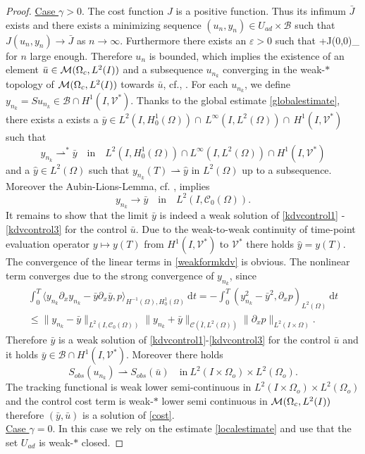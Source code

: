 \begin{proof}
\underline{Case $\gamma > 0$}. The cost function $J$ is a positive function. Thus its infimum $\bar J$ exists and there exists a minimizing sequence $(u_n,y_n) \in U_{ad} \times \mathcal B$ such that $J(u_n, y_n) \rightarrow \bar J$ as $n \rightarrow \infty$. Furthermore there exists an $\varepsilon>0$ such that
\be
\varepsilon+J(0,0)\geq \alpha {}_{\M}
\ee
for $n$ large enough. Therefore $u_n$ is bounded, which implies the existence of an element $\bar u\in\mathcal{M}(\Omega_c, L^{2}(I))$ and a subsequence $u_{n_k}$ converging in the weak-$*$ topology of $\mathcal{M}(\Omega_c, L^{2}(I))$ towards $\bar u$, cf., \cite[Corollary 3.30]{Brezis11}. For each $u_{n_k}$, we define $y_{n_k}=Su_{n_k}\in \mathcal B\cap H^1(I,\mathcal V^*)$. Thanks to the global estimate \eqref{globalestimate}, there exists a exists a $\bar y\in L^2(I,H^1_0(\Omega))\cap\,L^\infty(I,L^2(\Omega))\cap\,H^1(I,\mathcal V^\ast)$ such that
\[y_{n_k}\rightharpoonup^\ast\bar y\quad\text{in}\quad L^2(I,H^1_0(\Omega))\cap L^{\infty}(I,L^2(\Omega))\cap H^1(I,\mathcal V^\ast)\]
and a $\hat y\in L^2(\Omega)$ such that $y_{n_k}(T)\rightharpoonup \hat y$ in $L^2(\Omega)$ up to a subsequence. Moreover the Aubin-Lions-Lemma, cf. \cite[Chapter 3, Proposition 1.3]{showalter97}, implies
\[y_{n_k}\rightarrow\bar y\quad\text{in}\quad L^2(I,\mathcal C_0(\Omega)).\]
It remains to show that the limit $\bar y$ is indeed a weak solution of \eqref{kdvcontrol1} - \eqref{kdvcontrol3} for the control $\bar u$. Due to the weak-to-weak continuity of time-point evaluation operator $y\mapsto y(T)$ from $H^1(I,\mathcal V^\ast)$ to $\mathcal V^\ast$ there holds $\hat y=y(T)$.  The convergence of the linear terms in \eqref{weakformkdv} is obvious. The nonlinear term converges due to the strong convergence of $y_{n_k}$, since
\begin{multline*}
\int_0^T\langle y_{n_k}\partial_xy_{n_k}-\bar y\partial_x\bar y,p\rangle_{H^{-1}(\Omega),H^1_0(\Omega)}~\mathrm dt=-\int_0^T(y_{n_k}^2-\bar y^2,\partial_x p)_{L^2(\Omega)}~\mathrm dt\\
\leq\|y_{n_k}-\bar y\|_{L^2(I,\mathcal C_0(\Omega))}\|y_{n_k}+\bar y\|_{\mathcal C(\bar I,L^2(\Omega))}\|\partial_x p\|_{L^2(I\times \Omega)}.
\end{multline*}
Therefore $\bar y$ is a weak solution of \eqref{kdvcontrol1}-\eqref{kdvcontrol3} for the control $\bar u$ and it holds $\bar y\in \mathcal B\cap H^1(I,\mathcal V^*)$. Moreover there holds
\[S_{obs}(u_{n_k})\rightharpoonup S_{obs}(\bar u)\quad\text{in}~ L^2(I\times \Omega_{o})\times L^2(\Omega_{o}).\] The tracking functional is weak lower semi-continuous in $ L^2(I\times \Omega_{o})\times L^2(\Omega_{o})$ and the control cost term is weak-$*$ lower semi continuous in $\mathcal{M}(\Omega_c, L^{2}(I))$ therefore $(\bar y,\bar u)$ is a solution of \eqref{cost}.\\
\underline{Case $\gamma = 0$}. In this case we rely on the estimate \eqref{localestimate} and use that the set $U_{ad}$ is weak-$*$ closed.
\qquad\end{proof}

